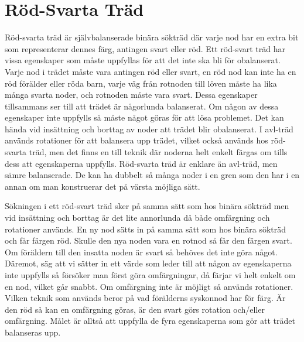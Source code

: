 \documentclass[a5paper,10pt,oneside]{article}
\begin{document}
\section*{Röd-Svarta Träd}

Röd-svarta träd är självbalanserade binära sökträd där varje nod har en extra bit som representerar dennes färg, antingen svart eller röd. Ett röd-svart träd har vissa egenskaper som måste uppfyllas för att det inte ska bli för obalanserat. Varje nod i trädet måste vara antingen röd eller svart, en röd nod kan inte ha en röd förälder eller röda barn, varje väg från rotnoden till löven måste ha lika många svarta noder, och rotnoden måste vara svart. Dessa egenskaper tillsammans ser till att trädet är någorlunda balanserat. Om någon av dessa egenskaper inte uppfylls så måste något göras för att lösa problemet. Det kan hända vid insättning och borttag av noder att trädet blir obalanserat. I avl-träd används rotationer för att balansera upp trädet, vilket också används hos röd-svarta träd, men det finns en till teknik där noderna helt enkelt färgas om tills dess att egenskaperna uppfylls. Röd-svarta träd är enklare än avl-träd, men sämre balanserade. De kan ha dubbelt så många noder i en gren som den har i en annan om man konstruerar det på värsta möjliga sätt.

Sökningen i ett röd-svart träd sker på samma sätt som hos binära sökträd men vid insättning och borttag är det lite annorlunda då både omfärgning och rotationer används. En ny nod sätts in på samma sätt som hos binära sökträd och får färgen röd. Skulle den nya noden vara en rotnod så får den färgen svart. Om föräldern till den insatta noden är svart så behöves det inte göra något. Däremot, säg att vi sätter in ett värde som leder till att någon av egenskaperna inte uppfylls så försöker man först göra omfärgningar, då färjar vi helt enkelt om en nod, vilket går snabbt. Om omfärgning inte är möjligt så används rotationer. Vilken teknik som används beror på vad förälderns syskonnod har för färg. Är den röd så kan en omfärgning göras, är den svart görs rotation och/eller omfärgning. Målet är alltså att uppfylla de fyra egenskaperna som gör att trädet balanseras upp.
\end{document}

